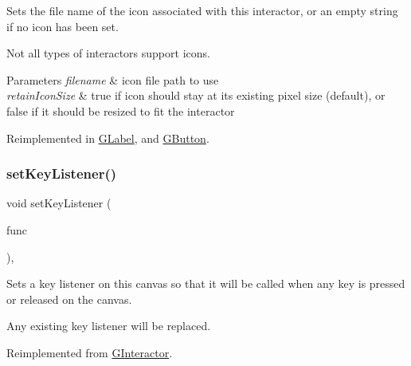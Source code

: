 Sets the file name of the icon associated with this interactor, or an empty string if no icon has been set. 

Not all types of interactors support icons. 
\begin{DoxyParams}{Parameters}
{\em filename} & icon file path to use \\
\hline
{\em retain\+Icon\+Size} & true if icon should stay at its existing pixel size (default), or false if it should be resized to fit the interactor \\
\hline
\end{DoxyParams}


Reimplemented in \mbox{\hyperlink{classsgl_1_1GLabel_abbefcb1f611af273755c7e1cca921497}{G\+Label}}, and \mbox{\hyperlink{classsgl_1_1GButton_abbefcb1f611af273755c7e1cca921497}{G\+Button}}.

\mbox{\label{classsgl_1_1GCanvas_a53809ec015da5bf9fad5e7a11b218993}} 
\subsubsection{\texorpdfstring{set\+Key\+Listener()}{setKeyListener()}\hspace{0.1cm}{\footnotesize\ttfamily [1/2]}}
{\footnotesize\ttfamily void set\+Key\+Listener (\begin{DoxyParamCaption}\item[{\mbox{\hyperlink{namespacesgl_ae9f3e9eab70035da1a2b114e21357b25}{G\+Event\+Listener}}}]{func }\end{DoxyParamCaption})\hspace{0.3cm}{\ttfamily [override]}, {\ttfamily [virtual]}}



Sets a key listener on this canvas so that it will be called when any key is pressed or released on the canvas. 

Any existing key listener will be replaced. 

Reimplemented from \mbox{\hyperlink{classsgl_1_1GInteractor_aeb8324d3287fa1fbe093f4d6230cf0a6}{G\+Interactor}}.

\mbox{\label{classsgl_1_1GCanvas_a1320ed9889a730dfead04a334463ecf3}} 
